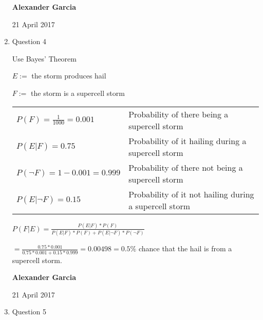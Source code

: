 \documentclass[11pt]{article}
\begin{document}
\begin{enumerate}
\begin{enumerate}[(a)]
			\end{enumerate}
\newpage
\textbf{Alexander Garcia}

21 April 2017 \\

		\item Question 4

			Use Bayes' Theorem

			$E:=$ the storm produces hail

			$F:=$ the storm is a supercell storm

			\begin{tabular}{ll}

				$P(F) = \frac{1}{1000} = 0.001$ & Probability of there being a supercell storm \\

				$P(E|F) = 0.75$ & Probability of it hailing during a supercell storm \\

				$P(\neg F) = 1-0.001 = 0.999$ & Probability of there not being a supercell storm \\

				$P(E|\neg F) = 0.15$ & Probability of it not hailing during a supercell storm \\

			\end{tabular}

			$P(F|E) = \frac{P(E|F)*P(F)}{P(E|F)*P(F) + P(E|\neg F)*P(\neg F)}$

			$=\frac{0.75 * 0.001}{0.75 * 0.001 + 0.15 * 0.999} = 0.00498 = 0.5\%$ chance that the hail is from
			a supercell storm.

\newpage
\textbf{Alexander Garcia}

21 April 2017 \\

		\item Question 5



\end{enumerate}
\end{document}

